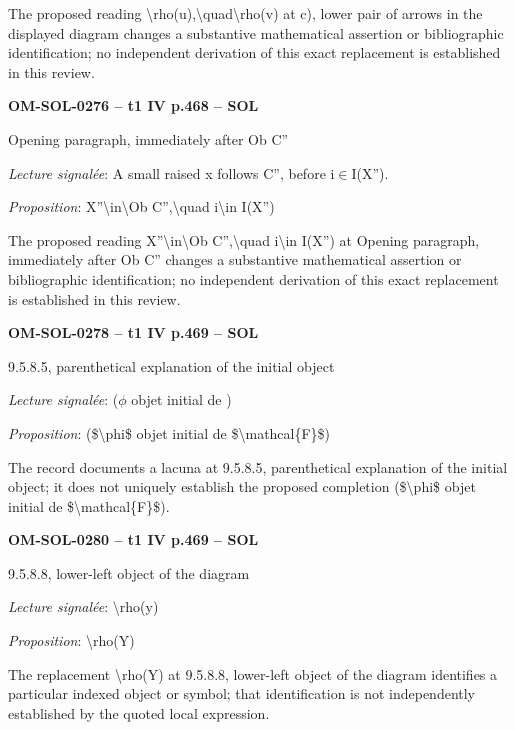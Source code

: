 The proposed reading \textbackslash{}rho(u),\textbackslash{}quad\textbackslash{}rho(v) at c), lower pair of arrows in the displayed diagram changes a substantive mathematical assertion or bibliographic identification; no independent derivation of this exact replacement is established in this review.\par
\par\noindent\textbf{OM-SOL-0276 -- t1 IV p.468 -- SOL}\par
Opening paragraph, immediately after Ob C''\par
\emph{Lecture signalée}: A small raised x follows C'', before i\ensuremath{\in}I(X'').\par
\emph{Proposition}: X''\textbackslash{}in\textbackslash{}Ob C'',\textbackslash{}quad i\textbackslash{}in I(X'')\par
The proposed reading X''\textbackslash{}in\textbackslash{}Ob C'',\textbackslash{}quad i\textbackslash{}in I(X'') at Opening paragraph, immediately after Ob C'' changes a substantive mathematical assertion or bibliographic identification; no independent derivation of this exact replacement is established in this review.\par
\par\noindent\textbf{OM-SOL-0278 -- t1 IV p.469 -- SOL}\par
9.5.8.5, parenthetical explanation of the initial object\par
\emph{Lecture signalée}: (\ensuremath{\phi} objet initial de )\par
\emph{Proposition}: (\$\textbackslash{}phi\$ objet initial de \$\textbackslash{}mathcal\{F\}\$)\par
The record documents a lacuna at 9.5.8.5, parenthetical explanation of the initial object; it does not uniquely establish the proposed completion (\$\textbackslash{}phi\$ objet initial de \$\textbackslash{}mathcal\{F\}\$).\par
\par\noindent\textbf{OM-SOL-0280 -- t1 IV p.469 -- SOL}\par
9.5.8.8, lower-left object of the diagram\par
\emph{Lecture signalée}: \textbackslash{}rho(y)\par
\emph{Proposition}: \textbackslash{}rho(Y)\par
The replacement \textbackslash{}rho(Y) at 9.5.8.8, lower-left object of the diagram identifies a particular indexed object or symbol; that identification is not independently established by the quoted local expression.\par

